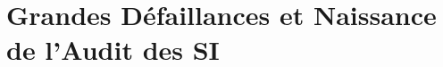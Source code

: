 
\chapter[Grandes Défaillances et Naissance de l'Audit des SI]{Grandes Défaillances et Naissance de l'Audit des SI}
\label{chap:defaillances}

